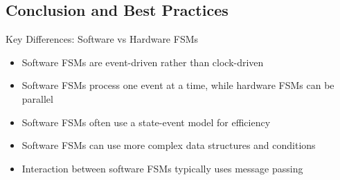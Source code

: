 \subsection{Conclusion and Best Practices}

\begin{concept}{Key Differences: Software vs Hardware FSMs}
\begin{itemize}
    \item Software FSMs are event-driven rather than clock-driven
    \item Software FSMs process one event at a time, while hardware FSMs can be parallel
    \item Software FSMs often use a state-event model for efficiency
    \item Software FSMs can use more complex data structures and conditions
    \item Interaction between software FSMs typically uses message passing
\end{itemize}
\end{concept}

